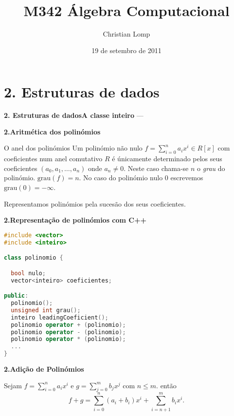 \documentclass{beamer}
\title[M342]{M342 Álgebra Computacional}
\author{Christian Lomp}
\institute{FCUP}
\date{19 de setembro de 2011}
\newcommand{\grau}[1]{\mathrm{grau}({#1})}
\begin{document}
\begin{frame}
\titlepage
\end{frame}





\section{2. Estruturas de dados}

\begin{frame}{\bf 2. Estruturas de dados}{\bf A classe inteiro}
---
\end{frame}


\begin{frame}{\bf 2.}{\bf Aritmética dos polinómios}
\begin{block}{O anel dos polinómios}
Um polinómio não nulo $f=\sum_{i=0}^n a_i x^i \in R[x]$ com coeficientes num anel comutativo $R$ é únicamente determinado pelos seus coeficientes $(a_0,a_1,\ldots, a_n)$ onde $a_n\neq 0$. Neste caso chama-se $n$ o {\it grau} do polinómio. $\grau{f}=n$. No caso do polinómio nulo $0$ escrevemos $\grau{0}=-\infty$.
\end{block}
Representamos polinómios pela sucesão dos seus coeficientes.
\end{frame}



\begin{frame}[fragile]{\bf 2.}{\bf Representação de polinómios com C++}

\begin{lstlisting}[language=C++]
#include <vector>
#include <inteiro>

class polinomio {

  bool nulo;
  vector<inteiro> coeficientes;

public:
  polinomio();
  unsigned int grau();
  inteiro leadingCoeficient();
  polinomio operator + (polinomio);
  polinomio operator - (polinomio);
  polinomio operator * (polinomio);
  ...
}

\end{lstlisting}
\end{frame}


\begin{frame}{\bf 2.}{\bf Adição de Polinómios}

Sejam $f=\sum_{i=0}^n a_i x^i$ e $g=\sum_{j=0}^m b_j x^j$ com $n\leq m$. então 
$$f+g = \sum_{i=0}^n (a_i+b_i) x^i  + \sum_{i=n+1}^m b_i x^i .$$
\end{frame}
\end{document}
